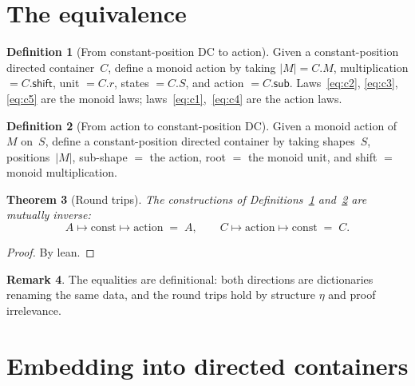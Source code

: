 \documentclass[11pt,a4paper]{article}
\theoremstyle{plain}
\newtheorem{theorem}{Theorem}[section]
\theoremstyle{definition}
\newtheorem{definition}[theorem]{Definition}
\newtheorem{remark}[theorem]{Remark}
\begin{document}
\section{The equivalence}

\begin{definition}[From constant-position DC to action]\label{def:to-action}
Given a constant-position directed container~$C$, define a monoid action
by taking $|M| = C.M$, multiplication $= C.\mathsf{shift}$, unit $=
C.r$, states $= C.S$, and action $= C.\mathsf{sub}$. Laws~\eqref{eq:c2},
\eqref{eq:c3}, \eqref{eq:c5} are the monoid laws;
laws~\eqref{eq:c1},~\eqref{eq:c4} are the action laws.
\end{definition}

\begin{definition}[From action to constant-position DC]\label{def:to-const}
Given a monoid action of~$M$ on~$S$, define a constant-position directed
container by taking shapes~$S$, positions~$|M|$, sub-shape $=$ the
action, root $=$ the monoid unit, and shift $=$ monoid multiplication.
\end{definition}

\begin{theorem}[Round trips]\label{thm:roundtrips}
The constructions of Definitions~\ref{def:to-action}
and~\ref{def:to-const} are mutually inverse:
\begin{equation}
  A \longmapsto \text{const} \longmapsto \text{action}
  \;=\; A,
  \qquad
  C \longmapsto \text{action} \longmapsto \text{const}
  \;=\; C.
\end{equation}
\end{theorem}

\begin{proof}
By lean.
\end{proof}

\begin{remark}
The equalities are definitional: both directions are dictionaries
renaming the same data, and the round trips hold by structure $\eta$ and
proof irrelevance.
\end{remark}

\section{Embedding into directed containers}
\end{document}
